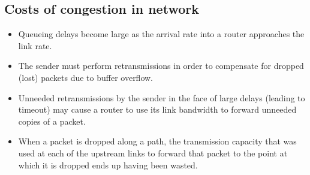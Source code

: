 \documentclass{article}
\theoremstyle{plain}
\theoremstyle{definition}
\begin{document}
\subsection{Costs of congestion in network}
\begin{itemize}
    \item Queueing delays become large as the arrival rate into a router approaches the link rate.
    
    \item The sender must perform retransmissions in order to compensate for dropped (lost) packets due to buffer overflow.
    
    \item Unneeded retransmissions by the sender in the face of large delays (leading to timeout) may cause a router to use its link bandwidth to forward unneeded copies of a packet.
    
    \item When a packet is dropped along a path, the transmission capacity that was used at each of the upstream links to forward that packet to the point at which it is dropped ends up having been wasted. 
\end{itemize}
\end{document}
